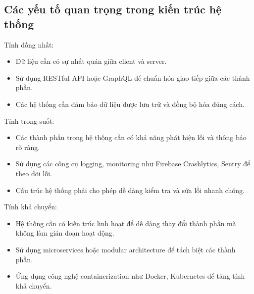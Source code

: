     \subsection{Các yếu tố quan trọng trong kiến trúc hệ thống}
    \renewcommand{\labelitemi}{--}
    \begin{flushleft}
        \hspace*{0.8cm}Tính đồng nhất:
        \setlength{\leftmargini}{1.5cm}
        \begin{itemize}
            \item Dữ liệu cần có sự nhất quán giữa client và server.
            \item Sử dụng RESTful API hoặc GraphQL để chuẩn hóa giao tiếp giữa các thành phần.
            \item Các hệ thống cần đảm bảo dữ liệu được lưu trữ và đồng bộ hóa đúng cách.
        \end{itemize}

        \hspace*{0.8cm}Tính trong suốt:
        \setlength{\leftmargini}{1.5cm}
        \begin{itemize}
            \item Các thành phần trong hệ thống cần có khả năng phát hiện lỗi và thông báo rõ ràng.
            \item Sử dụng các công cụ logging, monitoring như Firebase Crashlytics, Sentry để theo dõi lỗi.
            \item Cấu trúc hệ thống phải cho phép dễ dàng kiểm tra và sửa lỗi nhanh chóng.
        \end{itemize}

        \hspace*{0.8cm}Tính khả chuyển:
        \setlength{\leftmargini}{1.5cm}
        \begin{itemize}
            \item Hệ thống cần có kiến trúc linh hoạt để dễ dàng thay đổi thành phần mà không làm gián đoạn hoạt động.
            \item Sử dụng microservices hoặc modular architecture để tách biệt các thành phần.
            \item Ứng dụng công nghệ containerization như Docker, Kubernetes để tăng tính khả chuyển.
        \end{itemize}
    \end{flushleft}

